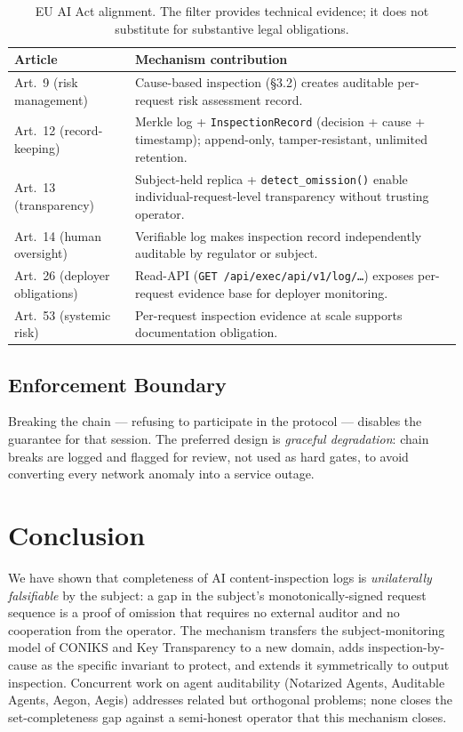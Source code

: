 \documentclass[11pt,a4paper]{article}
\newcommand{\code}[1]{\texttt{#1}}
\newcommand{\term}[1]{\emph{#1}}
\begin{document}
\begin{table}[h]
\centering
\small
\renewcommand{\arraystretch}{1.2}
\begin{tabular}{@{}lp{8cm}@{}}
\toprule
\textbf{Article} & \textbf{Mechanism contribution} \\
\midrule
Art.~9 (risk management) & Cause-based inspection (\S3.2) creates auditable per-request risk assessment record. \\
Art.~12 (record-keeping) & Merkle log + \code{InspectionRecord} (decision + cause + timestamp); append-only, tamper-resistant, unlimited retention. \\
Art.~13 (transparency) & Subject-held replica + \code{detect\_omission()} enable individual-request-level transparency without trusting operator. \\
Art.~14 (human oversight) & Verifiable log makes inspection record independently auditable by regulator or subject. \\
Art.~26 (deployer obligations) & Read-API (\code{GET /api/exec/api/v1/log/\ldots}) exposes per-request evidence base for deployer monitoring. \\
Art.~53 (systemic risk) & Per-request inspection evidence at scale supports documentation obligation. \\
\bottomrule
\end{tabular}
\caption{EU AI Act alignment. The filter provides technical evidence; it does not substitute for substantive legal obligations.}
\end{table}

\subsection{Enforcement Boundary}
\label{sec:enforcement}

Breaking the chain --- refusing to participate in the protocol --- disables the guarantee
for that session. The preferred design is \term{graceful degradation}: chain breaks are
logged and flagged for review, not used as hard gates, to avoid converting every network
anomaly into a service outage.

\section{Conclusion}

We have shown that completeness of AI content-inspection logs is \textit{unilaterally
falsifiable} by the subject: a gap in the subject's monotonically-signed request sequence
is a proof of omission that requires no external auditor and no cooperation from the
operator. The mechanism transfers the subject-monitoring model of CONIKS and Key
Transparency to a new domain, adds inspection-by-cause as the specific invariant to
protect, and extends it symmetrically to output inspection. Concurrent work on agent
auditability (Notarized Agents, Auditable Agents, Aegon, Aegis) addresses related but
orthogonal problems; none closes the set-completeness gap against a semi-honest operator
that this mechanism closes.
\end{document}
